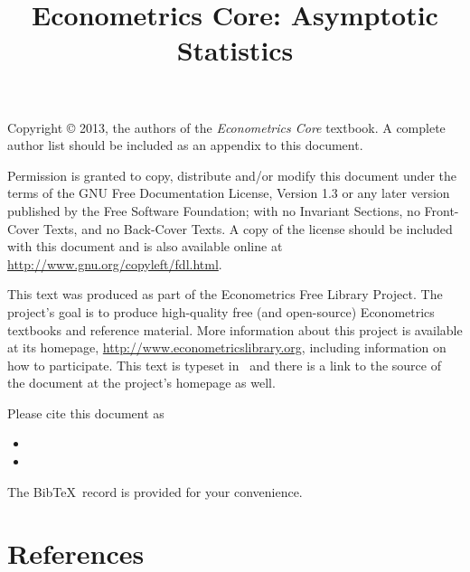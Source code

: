 \documentclass{tex/tufte-handout}
\title{Econometrics Core: Asymptotic Statistics}
\begin{document}
\maketitle

\bigskip\noindent%
Copyright © 2013, the authors of the \textit{Econometrics Core}
textbook.  A complete author list should be included as an appendix to
this document.

Permission is granted to copy, distribute and/or modify this document
under the terms of the GNU Free Documentation License, Version 1.3 or
any later version published by the Free Software Foundation; with no
Invariant Sections, no Front-Cover Texts, and no Back-Cover Texts.  A
copy of the license should be included with this document and is also
available online at \url{http://www.gnu.org/copyleft/fdl.html}.

This text was produced as part of the Econometrics Free Library
Project.  The project's goal is to produce high-quality free (and
open-source) Econometrics textbooks and reference material.  More
information about this project is available at its homepage,
\url{http://www.econometricslibrary.org}, including information on how
to participate.  This text is typeset in \XeLaTeX\ and there is a link
to the source of the document at the project's homepage as well.

Please cite this document as
\begin{itemize}
\item[] 
\item[] 
\end{itemize}
The Bib\!\TeX\ record is provided for your convenience.

\tableofcontents
\newpage
{}
\setcounter{page}{1}










\part*{References}%

\end{document}
